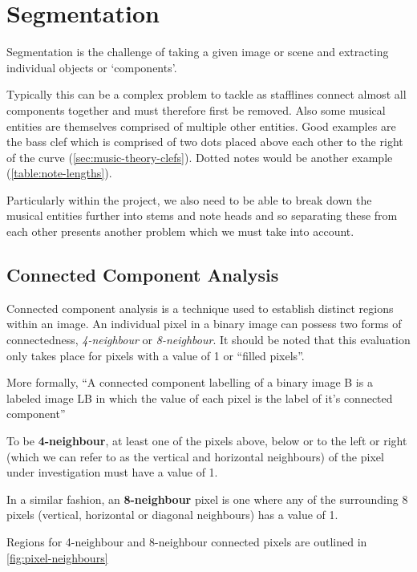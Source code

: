 \section{Segmentation}

Segmentation is the challenge of taking a given image or scene and extracting individual objects or `components'.

Typically this can be a complex problem to tackle as stafflines connect almost all components together and must therefore first be removed. Also some musical entities are themselves comprised of multiple other entities. Good examples are the bass clef which is comprised of two dots placed above each other to the right of the curve (\cref{sec:music-theory-clefs}). Dotted notes would be another example (\cref{table:note-lengths}).

Particularly within the \noteED project, we also need to be able to break down the musical entities further into stems and note heads and so separating these from each other presents another problem which we must take into account.

\subsection{Connected Component Analysis}
\label{sec:connected-component-analysis}

Connected component analysis is a technique used to establish distinct regions within an image. An individual pixel in a binary image can possess two forms of connectedness, \emph{4-neighbour} or \emph{8-neighbour}. It should be noted that this evaluation only takes place for pixels with a value of 1 or ``filled pixels''.

More formally, ``A connected component labelling of a binary image B is a labeled image LB in which the value of each pixel is the label of it's connected component'' \parencite[pg 69]{shapiro2001computer}

To be \textbf{4-neighbour}, at least one of the pixels above, below or to the left or right (which we can refer to as the vertical and horizontal neighbours) of the pixel under investigation must have a value of 1.

In a similar fashion, an \textbf{8-neighbour} pixel is one where any of the surrounding 8 pixels (vertical, horizontal or diagonal neighbours) has a value of 1.

Regions for 4-neighbour and 8-neighbour connected pixels are outlined in \cref{fig:pixel-neighbours}

